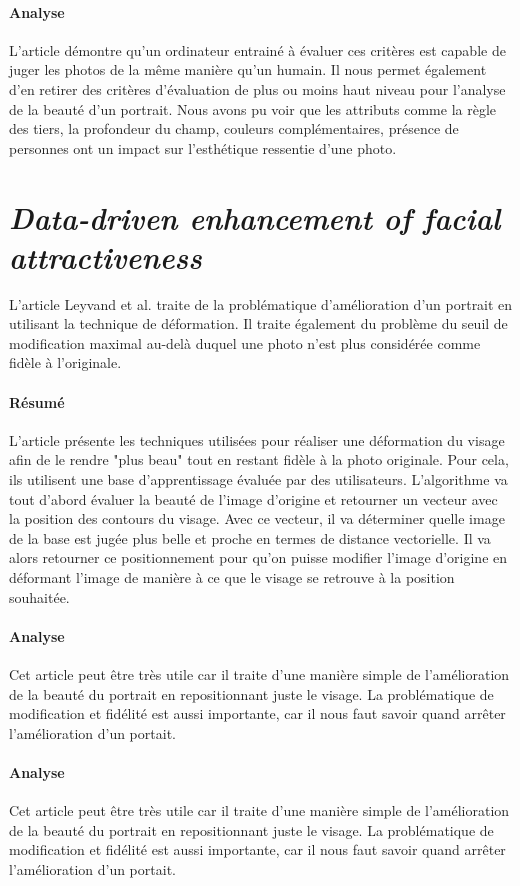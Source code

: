 \documentclass[11pt, french,screen]{report-rd-info}
\begin{document}
\paragraph{Analyse}
L'article démontre qu'un ordinateur entrainé à évaluer ces critères est capable de juger les photos de la même manière qu'un humain.
Il nous permet également d'en retirer des critères d'évaluation de plus ou moins haut niveau pour l'analyse de la beauté d'un portrait.
Nous avons pu voir que les attributs comme la règle des tiers, la profondeur du champ, couleurs complémentaires, présence de personnes ont un impact sur l'esthétique ressentie d'une photo.
\section{\emph{Data-driven enhancement of facial attractiveness}}
L'article Leyvand et al. \cite{Leyvand2008} traite de la problématique d'amélioration d'un portrait en utilisant la technique de déformation. Il traite également du problème du seuil de modification maximal au-delà duquel une photo n'est plus considérée comme fidèle à l'originale.
\paragraph{Résumé}
L'article présente les techniques utilisées pour réaliser une déformation du visage afin de le rendre  "plus beau" tout en restant fidèle à la photo originale. Pour cela, ils utilisent une base d'apprentissage évaluée par des utilisateurs.
L'algorithme va tout d'abord évaluer la beauté de l'image d'origine et retourner un vecteur avec la position des contours du visage. Avec ce vecteur, il va déterminer quelle image de la base est jugée plus belle et proche en termes de distance vectorielle. Il va alors retourner ce positionnement pour qu'on puisse modifier l'image d'origine en déformant l'image de manière à ce que le visage se retrouve à la position souhaitée.
\paragraph{Analyse}
Cet article peut être très utile car il traite d'une manière simple de l'amélioration de la beauté du portrait en repositionnant juste le visage. La problématique de modification et fidélité est aussi importante, car il nous faut savoir quand arrêter l'amélioration d'un portait.
\paragraph{Analyse}
Cet article peut être très utile car il traite d'une manière simple de l'amélioration de la beauté du portrait en repositionnant juste le visage. La problématique de modification et fidélité est aussi importante, car il nous faut savoir quand arrêter l'amélioration d'un portait.
\end{document}
